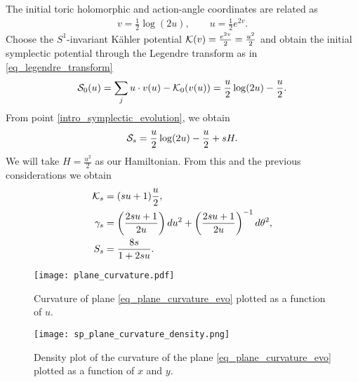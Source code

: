 \documentclass[notas.tex]{subfiles}
\begin{document}
The initial toric holomorphic and action-angle coordinates are related as
\begin{align*}
	v = \frac{1}{2}\log(2u), \qquad	u = \frac{1}{2}e^{2v}.
\end{align*}
Choose the $S^1$-invariant Kähler potential $\mathcal{K}(v) = \frac{e^{2v}}{2} = \frac{u^2}{2}$ and obtain the initial symplectic potential through the Legendre transform as in \eqref{eq_legendre_transform}
\begin{align*}
	 \mathcal{S}_0(u) = \sum_{j} u \cdot v(u) - \mathcal{K}_0(v(u)) = \frac{u}{2}\log(2u) - \frac{u}{2}.
\end{align*}
From point \eqref{intro_symplectic_evolution}, we obtain
\begin{align*}
	\mathcal{S}_{s} = \frac{u}{2} \log(2u) - \frac{u}{2} + sH.
\end{align*}
We will take $H = \frac{u^2}{2}$ as our Hamiltonian. From this and the previous considerations we obtain
\begin{align} 
\kpot_s &= %
(su+1)\frac{u}{2},\label{eq_plane_kpot_evo} \\
\gamma_s %
&=  \left ( \frac{2su+1}{2u} \right )du^2 + \left ( \frac{2su+1}{2u} \right )^{-1} d \theta ^2, \\
S_s &= \frac{8s}{1+2su}. \label{eq_plane_curvature_evo}
\end{align}

\begin{figure}[htbp]
	\centering
	\texttt{[image: plane\_curvature.pdf]}
	\caption{Curvature of plane \eqref{eq_plane_curvature_evo} plotted as a function of $u$.}
	\label{fig_plane_curvature}
\end{figure}
\begin{figure}[htbp]
	\centering
	\texttt{[image: sp\_plane\_curvature\_density.png]}
	\caption{Density plot of the curvature of the plane \eqref{eq_plane_curvature_evo} plotted as a function of $x$ and $y$.}
	\label{fig_plane_curvature_density}
\end{figure}



\end{document}

